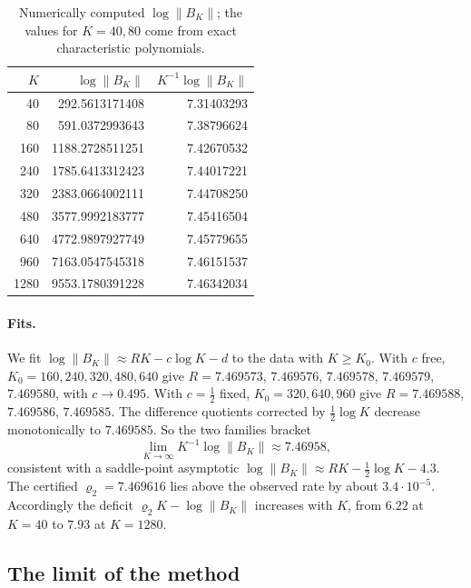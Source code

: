 \documentclass[11pt]{article}
\theoremstyle{remark}
\begin{document}
\begin{table}[ht]
\centering
\begin{tabular}{rrr}
\toprule
$K$ & $\log\|B_K\|$ & $K^{-1}\log\|B_K\|$\\
\midrule
40 & 292.5613171408 & 7.31403293\\
80 & 591.0372993643 & 7.38796624\\
160 & 1188.2728511251 & 7.42670532\\
240 & 1785.6413312423 & 7.44017221\\
320 & 2383.0664002111 & 7.44708250\\
480 & 3577.9992183777 & 7.45416504\\
640 & 4772.9897927749 & 7.45779655\\
960 & 7163.0547545318 & 7.46151537\\
1280 & 9553.1780391228 & 7.46342034\\
\bottomrule
\end{tabular}
\caption{Numerically computed $\log\|B_K\|$; the values for $K=40,80$ come from exact characteristic polynomials.}
\label{tab:truenorm}
\end{table}

\paragraph{Fits.} We fit $\log\|B_K\|\approx RK-c\log K-d$ to the data with $K\ge K_0$. With $c$ free, $K_0=160,240,320,480,640$ give $R=7.469573$, $7.469576$, $7.469578$, $7.469579$, $7.469580$, with $c\to0.495$. With $c=\frac12$ fixed, $K_0=320,640,960$ give $R=7.469588$, $7.469586$, $7.469585$. The difference quotients corrected by $\frac12\log K$ decrease monotonically to $7.469585$. So the two families bracket
\[
\lim_{K\to\infty}K^{-1}\log\|B_K\|\approx7.46958,
\]
consistent with a saddle-point asymptotic $\log\|B_K\|\approx RK-\frac12\log K-4.3$. The certified $\varrho_2=7.469616$ lies above the observed rate by about $3.4\cdot10^{-5}$. Accordingly the deficit $\varrho_2K-\log\|B_K\|$ increases with $K$, from $6.22$ at $K=40$ to $7.93$ at $K=1280$.

\subsection{The limit of the method}
\end{document}
